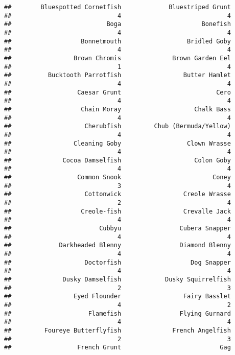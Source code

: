 \documentclass[
]{article}
\begin{document}
\begin{verbatim}
##        Bluespotted Cornetfish             Bluestriped Grunt 
##                             4                             4 
##                          Boga                      Bonefish 
##                             4                             4 
##                   Bonnetmouth                  Bridled Goby 
##                             4                             4 
##                 Brown Chromis              Brown Garden Eel 
##                             1                             4 
##          Bucktooth Parrotfish                 Butter Hamlet 
##                             4                             4 
##                  Caesar Grunt                          Cero 
##                             4                             4 
##                   Chain Moray                    Chalk Bass 
##                             4                             4 
##                    Cherubfish         Chub (Bermuda/Yellow) 
##                             4                             4 
##                 Cleaning Goby                  Clown Wrasse 
##                             4                             4 
##              Cocoa Damselfish                    Colon Goby 
##                             4                             4 
##                  Common Snook                         Coney 
##                             3                             4 
##                    Cottonwick                 Creole Wrasse 
##                             2                             4 
##                   Creole-fish                 Crevalle Jack 
##                             4                             4 
##                        Cubbyu                Cubera Snapper 
##                             4                             4 
##             Darkheaded Blenny                Diamond Blenny 
##                             4                             4 
##                    Doctorfish                   Dog Snapper 
##                             4                             4 
##              Dusky Damselfish            Dusky Squirrelfish 
##                             2                             3 
##                 Eyed Flounder                 Fairy Basslet 
##                             4                             2 
##                     Flamefish                Flying Gurnard 
##                             4                             4 
##         Foureye Butterflyfish              French Angelfish 
##                             2                             3 
##                  French Grunt                           Gag 

\end{verbatim}
\end{document}
